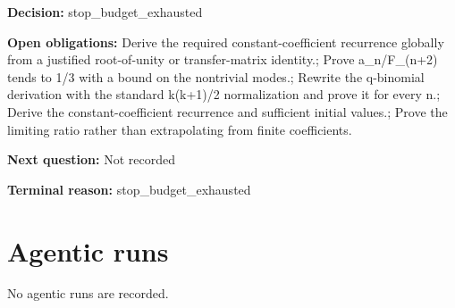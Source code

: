 \documentclass[11pt]{article}
\begin{document}
\textbf{Decision:} stop\_budget\_exhausted\par
\textbf{Open obligations:} Derive the required constant-coefficient recurrence globally from a justified root-of-unity or transfer-matrix identity.; Prove a\_n/F\_(n+2) tends to 1/3 with a bound on the nontrivial modes.; Rewrite the q-binomial derivation with the standard k(k+1)/2 normalization and prove it for every n.; Derive the constant-coefficient recurrence and sufficient initial values.; Prove the limiting ratio rather than extrapolating from finite coefficients.\par
\textbf{Next question:} Not recorded\par
\textbf{Terminal reason:} stop\_budget\_exhausted\par
\section{Agentic runs}
No agentic runs are recorded.\par
\end{document}
